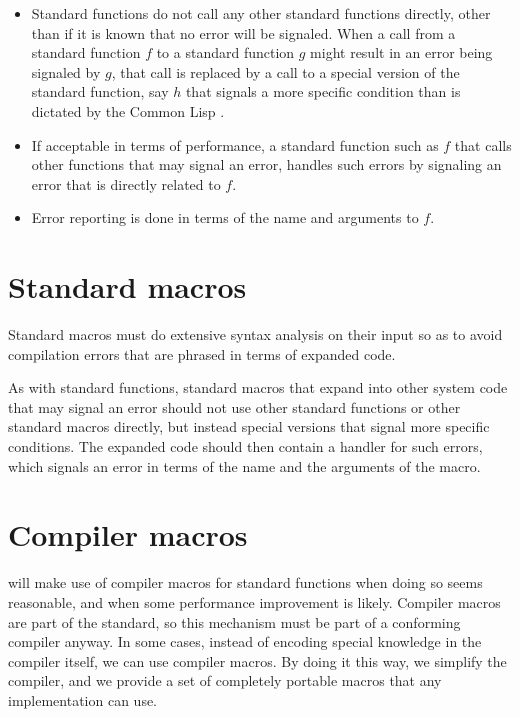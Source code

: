 \begin{itemize}
\item Standard functions do not call any other standard functions
  directly, other than if it is known that no error will be signaled.
  When a call from a standard function $f$ to a standard function $g$
  might result in an error being signaled by $g$, that call is
  replaced by a call to a special version of the standard function,
  say $h$ that signals a more specific condition than is dictated by
  the Common Lisp \hs{}.
\item If acceptable in terms of performance, a standard function such
  as $f$ that calls other functions that may signal an error, handles
  such errors by signaling an error that is directly related to $f$. 
\item Error reporting is done in terms of the name and arguments to
  $f$. 
  
\end{itemize}

\section{Standard macros}

Standard macros must do extensive syntax analysis on their input so as
to avoid compilation errors that are phrased in terms of expanded
code.  

As with standard functions, standard macros that expand into other
system code that may signal an error should not use other standard
functions or other standard macros directly, but instead special
versions that signal more specific conditions.  The expanded code
should then contain a handler for such errors, which signals an error
in terms of the name and the arguments of the macro. 

\section{Compiler macros}

{\sysname} will make use of compiler macros for standard functions
when doing so seems reasonable, and when some performance improvement
is likely.  Compiler macros are part of the standard, so this
mechanism must be part of a conforming compiler anyway.  In some
cases, instead of encoding special knowledge in the compiler itself,
we can use compiler macros.  By doing it this way, we simplify the
compiler, and we provide a set of completely portable macros that any
implementation can use.

